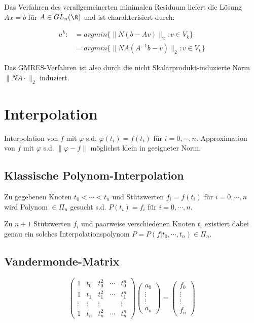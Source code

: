 Das Verfahren des verallgemeinerten minimalen Residuum liefert die Lösung $Ax=b$ für $A \in GL_n(\R)$ und ist charakterisiert durch:

\vspace{-4mm}
\begin{align*}
	u^k :&= argmin\{\|N(b-Av)\|_2 : v \in V_k\} \\
	     &= argmin\{\|NA(A^{-1}b-v)\|_2 : v \in V_k\}
\end{align*}

Das GMRES-Verfahren ist also durch die nicht Skalarprodukt-induzierte  Norm $\|NA\cdot\|_2$ induziert.

\section*{Interpolation}

Interpolation von $f$ mit $\varphi$ s.d. $\varphi(t_i) = f(t_i)$ für $i = 0,\cdots, n$. Approximation von $f$ mit $\varphi$ s.d. $\|\varphi - f\|$ möglichst klein in geeigneter Norm.

\subsection*{Klassische Polynom-Interpolation}

Zu gegebenen Knoten $t_0 < \cdots < t_n$ und Stützwerten $f_i = f(t_i)$ für $i = 0,\cdots,n$ wird Polynom $ \in \Pi_n$ gesucht s.d. $P(t_i)=f_i$ für $i = 0,\cdots,n$.

Zu $n+1$ Stützwerten $f_i$ und paarweise verschiedenen Knoten $t_i$ existiert dabei genau ein solches Interpolationspolynom $P=P(f|t_0,\cdots,t_n) \in \Pi_n$.

\subsection*{Vandermonde-Matrix}

$$\begin{pmatrix}
1      & t_0    & t_0^2  & \cdots & t_0^n  \\
1      & t_1    & t_1^2  & \cdots & t_1^n  \\
\vdots & \vdots & \vdots &        & \vdots \\
1      & t_n    & t_n^2  & \cdots & t_n^n
\end{pmatrix}
\begin{pmatrix}a_0 \\ \vdots \\ \vdots \\ a_n\end{pmatrix} =
\begin{pmatrix}f_0 \\ \vdots \\ \vdots \\ f_n\end{pmatrix}$$

